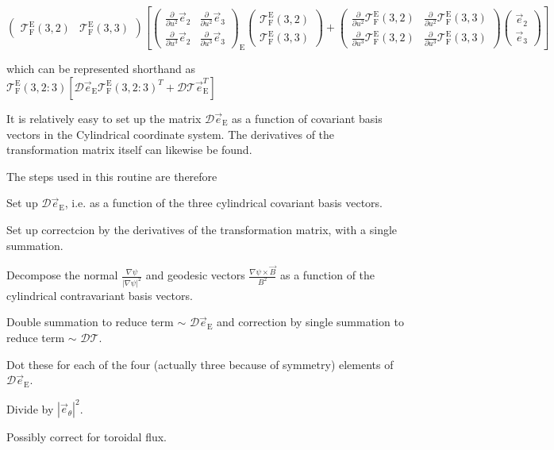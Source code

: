 $\begin{pmatrix}\mathcal{T}_\text{F}^\text{E}\left(3,2\right) & \mathcal{T}_\text{F}^\text{E}\left(3,3\right)\end{pmatrix} \left[ \begin{pmatrix} \frac{\partial}{\partial u^2} \vec{e}_{2} & \frac{\partial}{\partial u^2} \vec{e}_{3} \\ \frac{\partial}{\partial u^3} \vec{e}_{2} & \frac{\partial}{\partial u^3} \vec{e}_{3}\end{pmatrix}_\text{E} \begin{pmatrix}\mathcal{T}_\text{F}^\text{E}\left(3,2\right) \\ \mathcal{T}_\text{F}^\text{E}\left(3,3\right)\end{pmatrix} + \begin{pmatrix} \frac{\partial}{\partial u^2} \mathcal{T}_\text{F}^\text{E}\left(3,2\right) & \frac{\partial}{\partial u^2} \mathcal{T}_\text{F}^\text{E}\left(3,3\right) \\ \frac{\partial}{\partial u^3} \mathcal{T}_\text{F}^\text{E}\left(3,2\right) & \frac{\partial}{\partial u^3} \mathcal{T}_\text{F}^\text{E}\left(3,3\right) \end{pmatrix} \begin{pmatrix}\vec{e}_2 \\ \vec{e}_3\end{pmatrix} \right]$

which can be represented shorthand as $\mathcal{T}_\text{F}^\text{E}\left(3,2:3\right) \left[ \mathcal{D}\vec{e}_\text{E} \mathcal{T}_\text{F}^\text{E}\left(3,2:3\right)^T +\mathcal{D} \mathcal{T} \vec{e}_\text{E}^T \right]$

It is relatively easy to set up the matrix $\mathcal{D}\vec{e}_\text{E}$ as a function of covariant basis vectors in the Cylindrical coordinate system. The derivatives of the transformation matrix itself can likewise be found.

The steps used in this routine are therefore
\begin{DoxyEnumerate}
\item Set up $\mathcal{D}\vec{e}_\text{E}$, i.\+e. as a function of the three cylindrical covariant basis vectors.
\item Set up correctcion by the derivatives of the transformation matrix, with a single summation.
\item Decompose the normal $\frac{\nabla \psi}{\left|\nabla\psi\right|^2}$ and geodesic vectors $\frac{\nabla \psi \times \vec{B}}{B^2}$ as a function of the cylindrical contravariant basis vectors.
\item Double summation to reduce term $\sim$ $\mathcal{D}\vec{e}_\text{E}$ and correction by single summation to reduce term $\sim$ $\mathcal{D}\mathcal{T}$.
\item Dot these for each of the four (actually three because of symmetry) elements of $\mathcal{D}\vec{e}_\text{E}$.
\item Divide by $\left|\vec{e}_\theta\right|^2$.
\item Possibly correct for toroidal flux.
\end{DoxyEnumerate}

